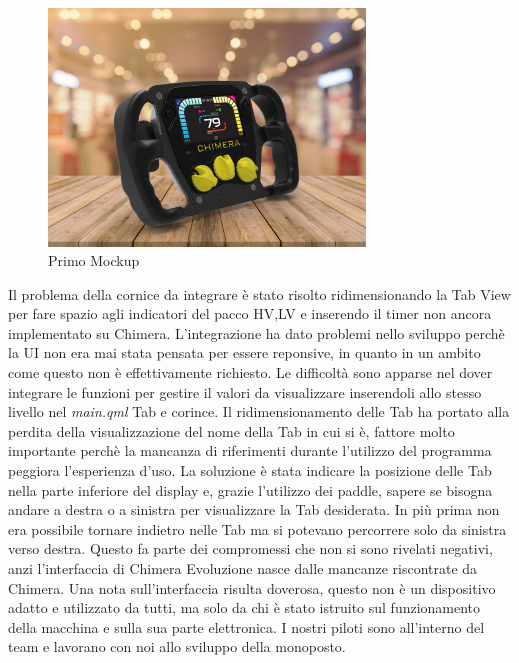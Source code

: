 \begin{figure}[hbt!]
    \centering
    \includegraphics[width=0.75\textwidth]{./figures/primoMockUpUI.jpg}
    \caption{Primo Mockup}
\end{figure}

Il problema della cornice da integrare è stato risolto ridimensionando la Tab View per fare spazio 
agli indicatori del pacco HV,LV e inserendo il timer non ancora implementato su Chimera. 
L'integrazione ha dato problemi nello sviluppo perchè la UI non era mai stata pensata per essere reponsive, in quanto in un ambito come questo non 
è effettivamente richiesto. 
Le difficoltà sono apparse nel dover integrare le funzioni per gestire il valori da visualizzare inserendoli allo stesso livello nel \emph{main.qml}
Tab e corince.
Il ridimensionamento delle Tab ha portato alla perdita della visualizzazione del nome della Tab in cui si è, fattore molto importante
perchè la mancanza di riferimenti durante l'utilizzo del programma peggiora l'esperienza d'uso.
La soluzione è stata indicare la posizione delle Tab nella parte inferiore del display e, grazie l'utilizzo dei paddle, sapere se bisogna andare a destra o a 
sinistra per visualizzare la Tab desiderata. 
In più prima non era possibile tornare indietro nelle Tab ma si potevano percorrere solo da sinistra verso destra.
Questo fa parte dei compromessi che non si sono rivelati negativi, anzi l'interfaccia di Chimera Evoluzione nasce dalle mancanze riscontrate da Chimera.
Una nota sull'interfaccia risulta doverosa, questo non è un dispositivo adatto e utilizzato da tutti, ma solo da chi è stato istruito 
sul funzionamento della macchina e sulla sua parte elettronica. I nostri piloti sono all'interno del team e lavorano con noi
allo sviluppo della monoposto.

